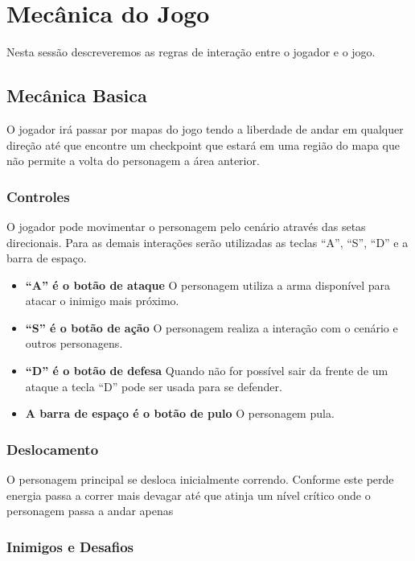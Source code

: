 \section{Mecânica do Jogo}


Nesta sessão descreveremos as regras de interação entre o jogador e o jogo.

\subsection {Mecânica Basica}

O jogador irá passar por mapas do jogo tendo a liberdade de andar em
 qualquer direção até que encontre um checkpoint que estará em uma região
 do mapa que não permite a volta do personagem a área anterior.

\subsubsection {Controles}

O jogador pode movimentar o personagem pelo cenário através das setas
 direcionais. Para as demais interações serão utilizadas as teclas
 ``A'', ``S'', ``D'' e a barra de espaço.
\begin{itemize}
\item {\bf ``A'' é o botão de ataque} O personagem utiliza a arma disponível
para atacar o inimigo mais próximo.
\item {\bf ``S'' é o botão de ação} O personagem realiza a interação com o
 cenário e outros personagens.
\item {\bf ``D'' é o botão de defesa} Quando não for possível sair da frente
 de um ataque a tecla ``D'' pode ser usada para se defender.
\item {\bf A barra de espaço é o botão de pulo} O personagem pula.
\end{itemize}

\subsubsection {Deslocamento}

O personagem principal se desloca inicialmente correndo. Conforme este 
perde energia passa a correr mais devagar até que atinja um nível crítico
onde o personagem passa a andar apenas

\subsubsection {Inimigos e Desafios}


